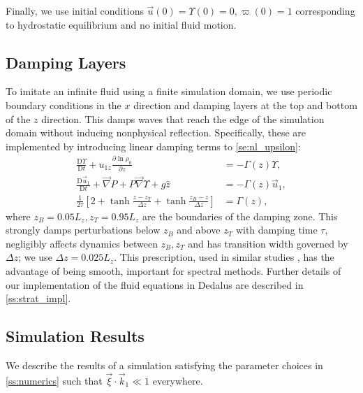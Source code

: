 \documentclass[
        fleqn,
        usenatbib,
    ]{mnras}
\newcommand*{\pd}[2]{\frac{\partial#1}{\partial#2}}
\newcommand*{\md}[2]{\frac{\mathrm{D}#1}{\mathrm{D}#2}}
\newcommand*{\s}[1]{\left[#1\right]}
\begin{document}
Finally, we use initial conditions $\vec{u}(0) = \Upsilon(0) = 0, \varpi(0) =
1$ corresponding to hydrostatic equilibrium and no initial fluid motion.

\subsection{Damping Layers}\label{ss:damping}

To imitate an infinite fluid using a finite simulation domain, we use periodic
boundary conditions in the $x$ direction and damping layers at the top and
bottom of the $z$ direction. This damps waves that reach the edge of the
simulation domain without inducing nonphysical reflection. Specifically, these
are implemented by introducing linear damping terms to \autoref{se:nl_upsilon}:
\begin{align}
    \md{\Upsilon}{t} + u_{1z} \pd{\ln \rho_0}{z} &=
        -\Gamma(z)\Upsilon,\nonumber\\
    \md{\vec{u}_1}{t} + \vec{\nabla}P + P\vec{\nabla}\Upsilon + g\hat{z} &=
        - \Gamma(z)\vec{u}_1,\nonumber\\
    \frac{1}{2\tau}\s{2 + \tanh \frac{z - z_T}{\Delta z}
        + \tanh \frac{z_B - z}{\Delta z}} &= \Gamma(z),\label{eq:Gamma}
\end{align}
where $z_B = 0.05L_z, z_T = 0.95L_z$ are the boundaries of the damping zone.
This strongly damps perturbations below $z_B$ and above $z_T$ with damping time
$\tau$, negligibly affects dynamics between $z_B, z_T$ and has transition width
governed by $\Delta z$; we use $\Delta z = 0.025L_z$. This prescription, used in
similar studies \citep{lecoanet_damp}, has the advantage of being smooth,
important for spectral methods. Further details of our implementation of the
fluid equations in Dedalus are described in \autoref{ss:strat_impl}.

\subsection{Simulation Results}\label{ss:lin_ns}

We describe the results of a simulation satisfying the parameter choices in
\autoref{ss:numerics} such that $\vec{\xi} \cdot \vec{k}_1 \ll 1$ everywhere.
\end{document}
